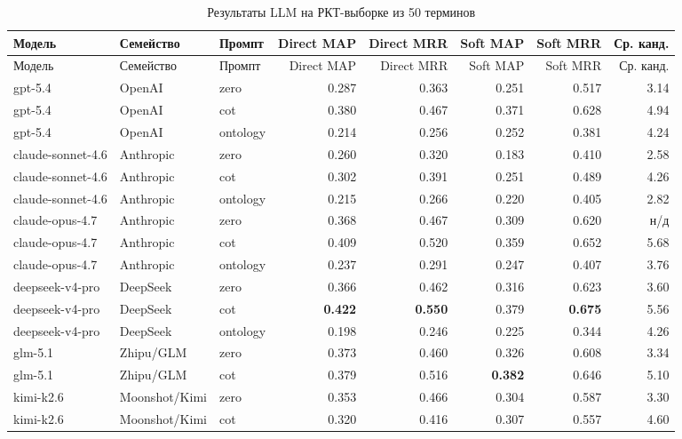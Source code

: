 \documentclass[12pt,a4paper,oneside,openany]{report}
\begin{document}
{\scriptsize
\setlength{\tabcolsep}{2pt}
\begin{longtable}{p{29mm}p{18mm}p{14mm}rrrrr}
\caption{Результаты LLM на РКТ-выборке из 50 терминов\protect\footnotemark}\\
\toprule
Модель & Семейство & Промпт & Direct MAP & Direct MRR & Soft MAP & Soft MRR & Ср. канд. \\
\midrule
\endfirsthead
\toprule
Модель & Семейство & Промпт & Direct MAP & Direct MRR & Soft MAP & Soft MRR & Ср. канд. \\
\midrule
\endhead
gpt-5.4 & OpenAI & zero & 0.287 & 0.363 & 0.251 & 0.517 & 3.14 \\
gpt-5.4 & OpenAI & cot & 0.380 & 0.467 & 0.371 & 0.628 & 4.94 \\
gpt-5.4 & OpenAI & ontology & 0.214 & 0.256 & 0.252 & 0.381 & 4.24 \\
claude-sonnet-4.6 & Anthropic & zero & 0.260 & 0.320 & 0.183 & 0.410 & 2.58 \\
claude-sonnet-4.6 & Anthropic & cot & 0.302 & 0.391 & 0.251 & 0.489 & 4.26 \\
claude-sonnet-4.6 & Anthropic & ontology & 0.215 & 0.266 & 0.220 & 0.405 & 2.82 \\
claude-opus-4.7 & Anthropic & zero & 0.368 & 0.467 & 0.309 & 0.620 & н/д \\
claude-opus-4.7 & Anthropic & cot & 0.409 & 0.520 & 0.359 & 0.652 & 5.68 \\
claude-opus-4.7 & Anthropic & ontology & 0.237 & 0.291 & 0.247 & 0.407 & 3.76 \\
deepseek-v4-pro & DeepSeek & zero & 0.366 & 0.462 & 0.316 & 0.623 & 3.60 \\
deepseek-v4-pro & DeepSeek & cot & \textbf{0.422} & \textbf{0.550} & 0.379 & \textbf{0.675} & 5.56 \\
deepseek-v4-pro & DeepSeek & ontology & 0.198 & 0.246 & 0.225 & 0.344 & 4.26 \\
glm-5.1 & Zhipu/GLM & zero & 0.373 & 0.460 & 0.326 & 0.608 & 3.34 \\
glm-5.1 & Zhipu/GLM & cot & 0.379 & 0.516 & \textbf{0.382} & 0.646 & 5.10 \\
kimi-k2.6 & Moonshot/Kimi & zero & 0.353 & 0.466 & 0.304 & 0.587 & 3.30 \\
kimi-k2.6 & Moonshot/Kimi & cot & 0.320 & 0.416 & 0.307 & 0.557 & 4.60 \\
\bottomrule
\end{longtable}
}
\end{document}
